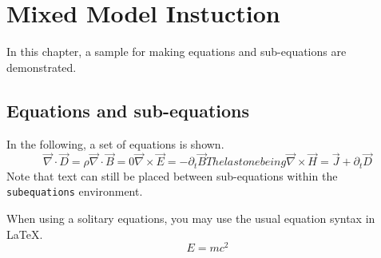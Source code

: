 \chapter{Mixed Model Instuction}

In this chapter, a sample for making equations and sub-equations
are demonstrated.

\section{Equations and sub-equations}

\hspace{\parindent} In the following, a set of equations is shown.
\begin{subequations}
\newcommand\del{\overrightarrow{\nabla}}
\begin{equation}\label{eq:EGauss}
    \del \cdot \vec{D} = \rho
\end{equation}
\begin{equation}\label{eq:BGauss}
    \del \cdot \vec{B} = 0
\end{equation}
\begin{equation}\label{eq:Faraday}
    \del \times \vec{E} = -\partial_t \vec{B}
\end{equation}
The last one being
\begin{equation}\label{eq:Ampere-Maxwell}
    \del \times \vec{H} = \vec{J} + \partial_t \vec{D}
\end{equation}
\end{subequations}
Note that text can still be placed between sub-equations within
the \verb+subequations+ environment.

When using a solitary equations, you may use the usual equation
syntax in \LaTeX.
\begin{equation}\label{eq:Maxwell}
    E = mc^2
\end{equation}
